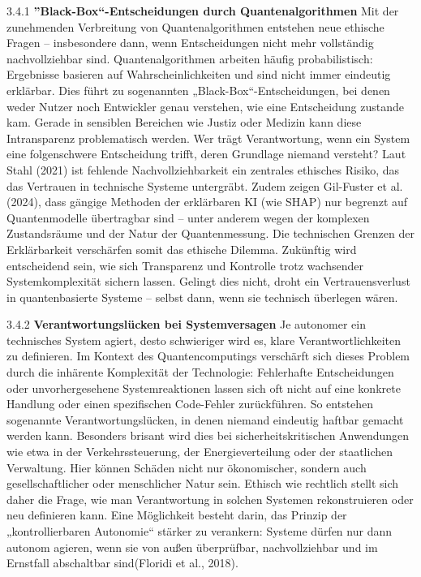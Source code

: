 3.4.1 \textbf{”Black-Box“-Entscheidungen durch Quantenalgorithmen}
Mit der zunehmenden Verbreitung von Quantenalgorithmen entstehen neue ethische Fragen – insbesondere dann, wenn Entscheidungen nicht mehr vollständig nachvollziehbar sind. Quantenalgorithmen arbeiten häufig probabilistisch: Ergebnisse basieren auf Wahrscheinlichkeiten und sind nicht immer eindeutig erklärbar. Dies führt zu sogenannten „Black-Box“-Entscheidungen, bei denen weder Nutzer noch Entwickler genau verstehen, wie eine Entscheidung zustande kam.
Gerade in sensiblen Bereichen wie Justiz oder Medizin kann diese Intransparenz problematisch werden. Wer trägt Verantwortung, wenn ein System eine folgenschwere Entscheidung trifft, deren Grundlage niemand versteht? Laut Stahl (2021) ist fehlende Nachvollziehbarkeit ein zentrales ethisches Risiko, das das Vertrauen in technische Systeme untergräbt.\cite{}
Zudem zeigen Gil-Fuster et al. (2024), dass gängige Methoden der erklärbaren KI (wie SHAP) nur begrenzt auf Quantenmodelle übertragbar sind – unter anderem wegen der komplexen Zustandsräume und der Natur der Quantenmessung. Die technischen Grenzen der Erklärbarkeit verschärfen somit das ethische Dilemma.
Zukünftig wird entscheidend sein, wie sich Transparenz und Kontrolle trotz wachsender Systemkomplexität sichern lassen. Gelingt dies nicht, droht ein Vertrauensverlust in quantenbasierte Systeme – selbst dann, wenn sie technisch überlegen wären.

 

 3.4.2 \textbf{Verantwortungslücken bei Systemversagen}
 Je autonomer ein technisches System agiert, desto schwieriger wird es, klare Verantwortlichkeiten zu definieren. Im Kontext des Quantencomputings verschärft sich dieses Problem durch die inhärente Komplexität der Technologie: Fehlerhafte Entscheidungen oder unvorhergesehene Systemreaktionen lassen sich oft nicht auf eine konkrete Handlung oder einen spezifischen Code-Fehler zurückführen. So entstehen sogenannte Verantwortungslücken, in denen niemand eindeutig haftbar gemacht werden kann.
Besonders brisant wird dies bei sicherheitskritischen Anwendungen wie etwa in der Verkehrssteuerung, der Energieverteilung oder der staatlichen Verwaltung. Hier können Schäden nicht nur ökonomischer, sondern auch gesellschaftlicher oder menschlicher Natur sein. Ethisch wie rechtlich stellt sich daher die Frage, wie man Verantwortung in solchen Systemen rekonstruieren oder neu definieren kann. Eine Möglichkeit besteht darin, das Prinzip der „kontrollierbaren Autonomie“ stärker zu verankern: Systeme dürfen nur dann autonom agieren, wenn sie von außen überprüfbar, nachvollziehbar und im Ernstfall abschaltbar sind(Floridi et al., 2018).
 
